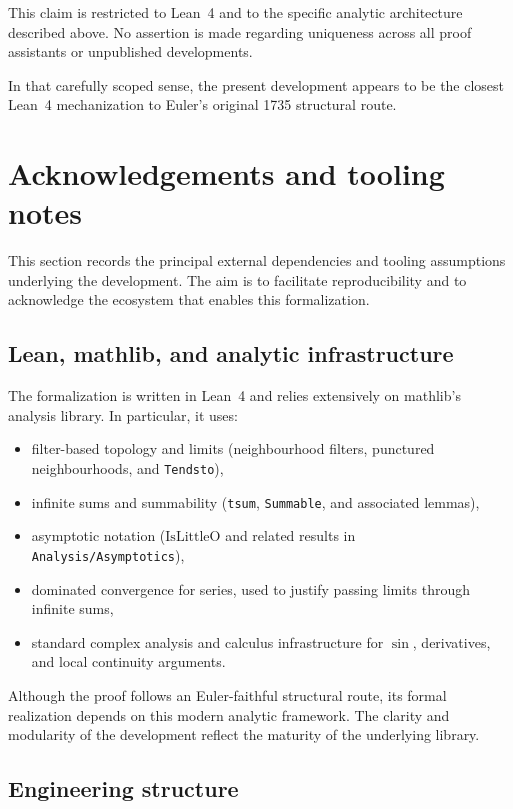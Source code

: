 \documentclass[11pt,a4paper]{article}
\theoremstyle{plain}
\theoremstyle{definition}
\begin{document}
This claim is restricted to Lean~4 and to the specific analytic architecture described above. No assertion is made regarding uniqueness across all proof assistants or unpublished developments.

In that carefully scoped sense, the present development appears to be the closest Lean~4 mechanization to Euler’s original 1735 structural route.

\section{Acknowledgements and tooling notes}

This section records the principal external dependencies and tooling assumptions underlying the development. The aim is to facilitate reproducibility and to acknowledge the ecosystem that enables this formalization.

\subsection{Lean, mathlib, and analytic infrastructure}

The formalization is written in Lean~4 and relies extensively on mathlib’s analysis library. In particular, it uses:

\begin{itemize}[leftmargin=2em]
  \item filter-based topology and limits (neighbourhood filters, punctured neighbourhoods, and \texttt{Tendsto}),
  \item infinite sums and summability (\texttt{tsum}, \texttt{Summable}, and associated lemmas),
  \item asymptotic notation (\(\mathrm{IsLittleO}\) and related results in \texttt{Analysis/Asymptotics}),
  \item dominated convergence for series, used to justify passing limits through infinite sums,
  \item standard complex analysis and calculus infrastructure for \(\sin\), derivatives, and local continuity arguments.
\end{itemize}

Although the proof follows an Euler-faithful structural route, its formal realization depends on this modern analytic framework. The clarity and modularity of the development reflect the maturity of the underlying library.

\subsection{Engineering structure}
\end{document}
